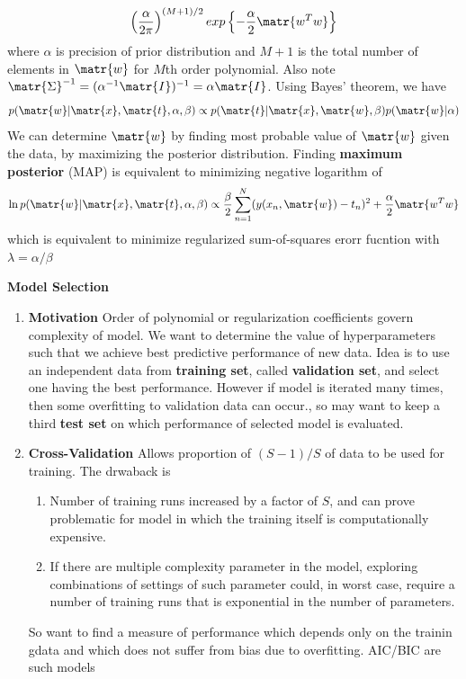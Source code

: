\documentclass[11pt]{article}
\begin{document}
\begin{defn*}
\begin{enumerate}
\[            \left( \frac{\alpha}{2\pi} \right)^{(M+1)/2}
            \exponents{-\frac{\alpha}{2} \matr{w^Tw}}
        \]
        where $\alpha$ is precision of prior distribution and $M+1$ is the total number of elements in $\matr{w}$ for $M$th order polynomial. Also note $\matr{\Sigma}^{-1} = (\alpha^{-1}\matr{I})^{-1} = \alpha\matr{I}$. Using Bayes' theorem, we have 
        \[
            p(\matr{w}|\matr{x},\matr{t}, \alpha, \beta)
            \propto 
            p(\matr{t}|\matr{x}, \matr{w}, \beta) p(\matr{w}|\alpha)
        \]
        We can determine $\matr{w}$ by finding most probable value of $\matr{w}$ given the data, by maximizing the posterior distribution. Finding \textbf{maximum posterior} (MAP) is equivalent to minimizing negative logarithm of 
        \[
            \ln{p(\matr{w}|\matr{x},\matr{t}, \alpha, \beta)} \propto \frac{\beta}{2} \sum_{n=1}^N (y(x_n, \matr{w}) - t_n)^2 + \frac{\alpha}{2} \matr{w^Tw}    
        \]
        which is equivalent to minimize regularized sum-of-squares erorr fucntion with $\lambda = \alpha/\beta$
    \end{enumerate}
\end{defn*}

\begin{defn*}
    \textbf{Model Selection} 
    \begin{enumerate}
        \item \textbf{Motivation} Order of polynomial or regularization coefficients govern complexity of model. We want to determine the value of hyperparameters such that we achieve best predictive performance of new data. Idea is to use an independent data from \textbf{training set}, called \textbf{validation set}, and select one having the best performance. However if model is iterated many times, then some overfitting to validation data can occur., so may want to keep a third \textbf{test set} on which performance of selected model is evaluated. 
        \item \textbf{Cross-Validation} Allows proportion of $(S-1)/S$ of data to be used for training. The drwaback is 
        \begin{enumerate}
            \item Number of training runs increased by a factor of $S$, and can prove problematic for model in which the training itself is computationally expensive.
            \item If there are multiple complexity parameter in the model, exploring combinations of settings of such parameter could, in worst case, require a number of training runs that is exponential in the number of parameters. 
        \end{enumerate}
        So want to find a measure of performance which depends only on the trainin gdata and which does not suffer from bias due to overfitting. AIC/BIC are such models
    \end{enumerate}
\end{defn*}
\end{document}
